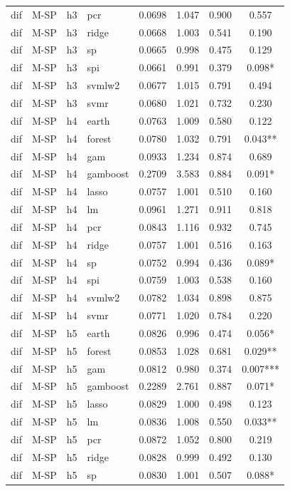 \begin{ThreePartTable}
\begin{longtable}[t]{llclcccc}
dif & M-SP & h3 & pcr & 0.0698 & 1.047 & 0.900 & 0.557\\
dif & M-SP & h3 & ridge & 0.0668 & 1.003 & 0.541 & 0.190\\
dif & M-SP & h3 & sp & 0.0665 & 0.998 & 0.475 & 0.129\\
dif & M-SP & h3 & spi & 0.0661 & 0.991 & 0.379 & 0.098*\\
dif & M-SP & h3 & svmlw2 & 0.0677 & 1.015 & 0.791 & 0.494\\
dif & M-SP & h3 & svmr & 0.0680 & 1.021 & 0.732 & 0.230\\
\addlinespace
dif & M-SP & h4 & earth & 0.0763 & 1.009 & 0.580 & 0.122\\
dif & M-SP & h4 & forest & 0.0780 & 1.032 & 0.791 & 0.043**\\
dif & M-SP & h4 & gam & 0.0933 & 1.234 & 0.874 & 0.689\\
dif & M-SP & h4 & gamboost & 0.2709 & 3.583 & 0.884 & 0.091*\\
dif & M-SP & h4 & lasso & 0.0757 & 1.001 & 0.510 & 0.160\\
dif & M-SP & h4 & lm & 0.0961 & 1.271 & 0.911 & 0.818\\
dif & M-SP & h4 & pcr & 0.0843 & 1.116 & 0.932 & 0.745\\
dif & M-SP & h4 & ridge & 0.0757 & 1.001 & 0.516 & 0.163\\
dif & M-SP & h4 & sp & 0.0752 & 0.994 & 0.436 & 0.089*\\
dif & M-SP & h4 & spi & 0.0759 & 1.003 & 0.538 & 0.160\\
dif & M-SP & h4 & svmlw2 & 0.0782 & 1.034 & 0.898 & 0.875\\
dif & M-SP & h4 & svmr & 0.0771 & 1.020 & 0.784 & 0.220\\
\addlinespace
dif & M-SP & h5 & earth & 0.0826 & 0.996 & 0.474 & 0.056*\\
dif & M-SP & h5 & forest & 0.0853 & 1.028 & 0.681 & 0.029**\\
dif & M-SP & h5 & gam & 0.0812 & 0.980 & 0.374 & 0.007***\\
dif & M-SP & h5 & gamboost & 0.2289 & 2.761 & 0.887 & 0.071*\\
dif & M-SP & h5 & lasso & 0.0829 & 1.000 & 0.498 & 0.123\\
dif & M-SP & h5 & lm & 0.0836 & 1.008 & 0.550 & 0.033**\\
dif & M-SP & h5 & pcr & 0.0872 & 1.052 & 0.800 & 0.219\\
dif & M-SP & h5 & ridge & 0.0828 & 0.999 & 0.492 & 0.130\\
dif & M-SP & h5 & sp & 0.0830 & 1.001 & 0.507 & 0.088*\\

\end{longtable}
\end{ThreePartTable}
